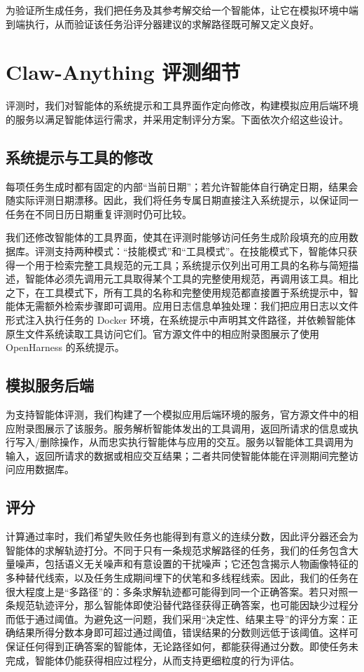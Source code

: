\documentclass[10pt]{article}
\begin{document}
为验证所生成任务，我们把任务及其参考解交给一个智能体，让它在模拟环境中端到端执行，从而验证该任务沿评分器建议的求解路径既可解又定义良好。

\section{Claw-Anything 评测细节}

评测时，我们对智能体的系统提示和工具界面作定向修改，构建模拟应用后端环境的服务以满足智能体运行需求，并采用定制评分方案。下面依次介绍这些设计。

\subsection{系统提示与工具的修改}

每项任务生成时都有固定的内部“当前日期”；若允许智能体自行确定日期，结果会随实际评测日期漂移。因此，我们将任务专属日期直接注入系统提示，以保证同一任务在不同日历日期重复评测时仍可比较。

我们还修改智能体的工具界面，使其在评测时能够访问任务生成阶段填充的应用数据库。评测支持两种模式：“技能模式”和“工具模式”。在技能模式下，智能体只获得一个用于检索完整工具规范的元工具；系统提示仅列出可用工具的名称与简短描述，智能体必须先调用元工具取得某个工具的完整使用规范，再调用该工具。相比之下，在工具模式下，所有工具的名称和完整使用规范都直接置于系统提示中，智能体无需额外检索步骤即可调用。应用日志信息单独处理：我们把应用日志以文件形式注入执行任务的 Docker 环境，在系统提示中声明其文件路径，并依赖智能体原生文件系统读取工具访问它们。官方源文件中的相应附录图展示了使用 OpenHarness 的系统提示。

\subsection{模拟服务后端}

为支持智能体评测，我们构建了一个模拟应用后端环境的服务，官方源文件中的相应附录图展示了该服务。服务解析智能体发出的工具调用，返回所请求的信息或执行写入/删除操作，从而忠实执行智能体与应用的交互。服务以智能体工具调用为输入，返回所请求的数据或相应交互结果；二者共同使智能体能在评测期间完整访问应用数据库。

\subsection{评分}

计算通过率时，我们希望失败任务也能得到有意义的连续分数，因此评分器还会为智能体的求解轨迹打分。不同于只有一条规范求解路径的任务，我们的任务包含大量噪声，包括语义无关噪声和有意设置的干扰噪声；它还包含揭示人物画像特征的多种替代线索，以及任务生成期间埋下的伏笔和多线程线索。因此，我们的任务在很大程度上是“多路径”的：多条求解轨迹都可能得到同一个正确答案。若只对照一条规范轨迹评分，那么智能体即使沿替代路径获得正确答案，也可能因缺少过程分而低于通过阈值。为避免这一问题，我们采用“决定性、结果主导”的评分方案：正确结果所得分数本身即可超过通过阈值，错误结果的分数则远低于该阈值。这样可保证任何得到正确答案的智能体，无论路径如何，都能获得通过分数。即使任务未完成，智能体仍能获得相应过程分，从而支持更细粒度的行为评估。
\end{document}
